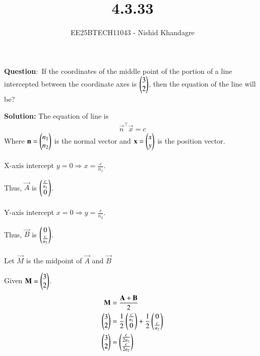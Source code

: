 \documentclass[journal]{IEEEtran}
\title{4.3.33}
\author{EE25BTECH11043 - Nishid Khandagre}
\begin{document}
\maketitle

\renewcommand{\thefigure}{\theenumi}
\renewcommand{\thetable}{\theenumi}


\textbf{Question}:\
If the coordinates of the middle point of the portion of a line intercepted between the
coordinate axes is $\begin{pmatrix}3\\2\end{pmatrix}$, then the equation of the line will be?

\textbf{Solution: }
The equation of line is
\begin{align}
\vec{n}^\top\vec{x} = c
\end{align}
Where $\mathbf{n} = \begin{pmatrix}n_1 \\ n_2\end{pmatrix}$ is the normal vector and $\mathbf{x} = \begin{pmatrix}x \\ y\end{pmatrix}$ is the position vector.\\ \\






X-axis intercept $y=0 \Rightarrow x = \frac{c}{n_1}$.

Thus, $\vec{A}$ is $\begin{pmatrix}\frac{c}{n_1} \\ 0\end{pmatrix}$.\\ \\



Y-axis intercept $x=0 \Rightarrow y = \frac{c}{n_2}$.

Thus, $\vec{B}$ is $\begin{pmatrix}0 \\ \frac{c}{n_2}\end{pmatrix}$.\\ \\

Let $\vec{M}$ is the midpoint of $\vec{A}$ and $\vec{B}$

Given $\mathbf{M} = \begin{pmatrix}3 \\ 2\end{pmatrix}$.
\begin{align}
\mathbf{M} &= \frac{\mathbf{A} + \mathbf{B}}{2} \\
\begin{pmatrix}3\\2\end{pmatrix}&= \frac{1}{2} \begin{pmatrix}\frac{c}{n_1} \\ 0\end{pmatrix} + \frac{1}{2} \begin{pmatrix}0 \\ \frac{c}{n_2}\end{pmatrix} \\
\begin{pmatrix}3\\2\end{pmatrix}&= \begin{pmatrix}\frac{c}{2n_1} \\ \frac{c}{2n_2}\end{pmatrix}
\end{align}
\end{document}
